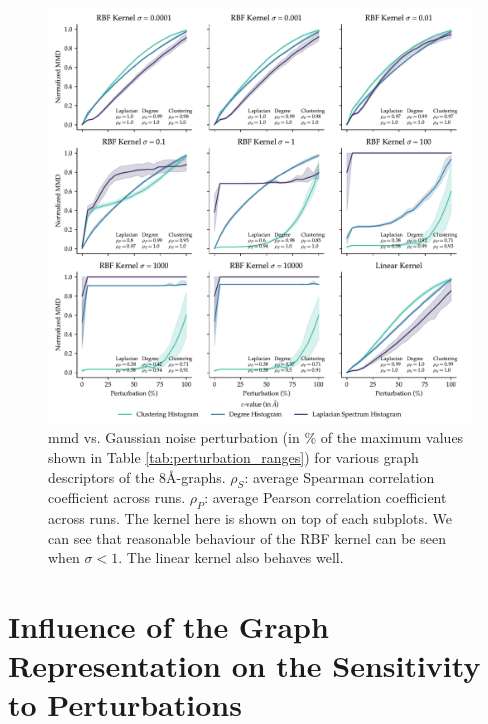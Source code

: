 \begin{figure}[!htbp]
  \centering
  \includegraphics[width=\textwidth]{./figures/results/res_1_2.pdf}
  \caption[Influence of kernel parameters on \acrshort{mmd} behaviour.]{\acrshort{mmd} vs. Gaussian
    noise perturbation (in \% of the maximum values shown
    in Table \ref{tab:perturbation_ranges}) for various graph descriptors of the
    8\si{\angstrom}-graphs. $\rho_{S}$: average Spearman correlation coefficient
    across runs. $\rho_{P}$: average Pearson correlation coefficient across runs.
    The kernel here is shown on top of each subplots. We can see that reasonable
    behaviour of the RBF kernel can be seen when $\sigma<1$. The linear kernel also
    behaves well.}
  \label{fig:mmd_effect_kernel}
\end{figure}

\section{Influence of the Graph Representation on the Sensitivity to
  Perturbations}\label{sec:results_sensitivity}

